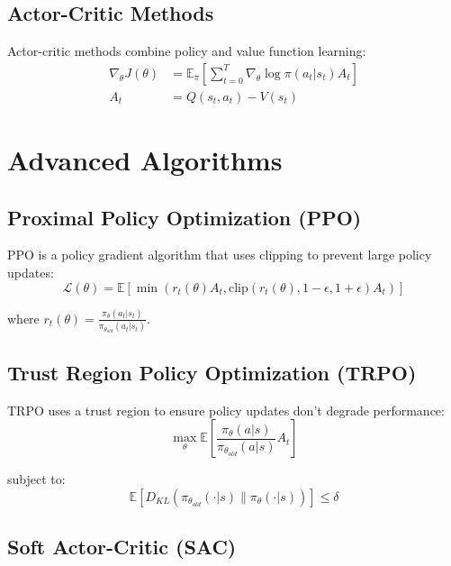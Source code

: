 \subsection{Actor-Critic Methods}

Actor-critic methods combine policy and value function learning:
\begin{align}
    \nabla_\theta J(\theta) &= \mathbb{E}_\pi\left[\sum_{t=0}^T \nabla_\theta \log \pi(a_t|s_t) A_t\right] \\
    A_t &= Q(s_t,a_t) - V(s_t)
\end{align}

\section{Advanced Algorithms}

\subsection{Proximal Policy Optimization (PPO)}

PPO is a policy gradient algorithm that uses clipping to prevent large policy updates:
\begin{equation}
    \mathcal{L}(\theta) = \mathbb{E}\left[\min(r_t(\theta) A_t, \text{clip}(r_t(\theta), 1-\epsilon, 1+\epsilon) A_t)\right]
\end{equation}

where $r_t(\theta) = \frac{\pi_\theta(a_t|s_t)}{\pi_{\theta_{old}}(a_t|s_t)}$.

\subsection{Trust Region Policy Optimization (TRPO)}

TRPO uses a trust region to ensure policy updates don't degrade performance:
\begin{equation}
    \max_\theta \mathbb{E}\left[\frac{\pi_\theta(a|s)}{\pi_{\theta_{old}}(a|s)} A_t\right]
\end{equation}

subject to:
\begin{equation}
    \mathbb{E}[D_{KL}(\pi_{\theta_{old}}(\cdot|s) \| \pi_\theta(\cdot|s))] \leq \delta
\end{equation}

\subsection{Soft Actor-Critic (SAC)}

